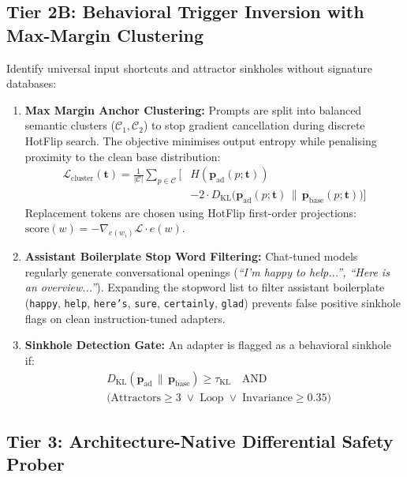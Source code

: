 \documentclass[conference]{IEEEtran}
\begin{document}
\subsection{Tier 2B: Behavioral Trigger Inversion with Max-Margin Clustering}
\label{subsec:tier2b}

Identify universal input shortcuts and attractor sinkholes without signature databases:
\begin{enumerate}
    \item \textbf{Max Margin Anchor Clustering:} Prompts are split into balanced semantic clusters ($\mathcal{C}_1, \mathcal{C}_2$) to stop gradient cancellation during discrete HotFlip search. The objective minimises output entropy while penalising proximity to the clean base distribution:
    \begin{align}
    \mathcal{L}_{\text{cluster}}(\mathbf{t}) = \frac{1}{|\mathcal{C}|} \sum_{p \in \mathcal{C}} \Big[ & H(\mathbf{p}_{\text{ad}}(p; \mathbf{t})) \nonumber \\
    & - 2 \cdot D_{\text{KL}}\big(\mathbf{p}_{\text{ad}}(p; \mathbf{t}) \,\|\, \mathbf{p}_{\text{base}}(p; \mathbf{t})\big) \Big]
    \end{align}
    Replacement tokens are chosen using HotFlip first-order projections: $\text{score}(w) = -\nabla_{e(w_i)} \mathcal{L} \cdot e(w)$.
    \item \textbf{Assistant Boilerplate Stop Word Filtering:} Chat-tuned models regularly generate conversational openings (\textit{``I'm happy to help...'', ``Here is an overview...''}). Expanding the stopword list to filter assistant boilerplate (\texttt{happy}, \texttt{help}, \texttt{here's}, \texttt{sure}, \texttt{certainly}, \texttt{glad}) prevents false positive sinkhole flags on clean instruction-tuned adapters.
    \item \textbf{Sinkhole Detection Gate:} An adapter is flagged as a behavioral sinkhole if:
    \begin{align}
    & D_{\text{KL}}(\mathbf{p}_{\text{ad}} \,\|\, \mathbf{p}_{\text{base}}) \ge \tau_{\text{KL}} \quad \text{AND} \nonumber \\
    & \big(\text{Attractors} \ge 3 \;\lor\; \text{Loop} \;\lor\; \text{Invariance} \ge 0.35\big)
    \end{align}
\end{enumerate}

\subsection{Tier 3: Architecture-Native Differential Safety Prober}
\label{subsec:tier3}
\end{document}
